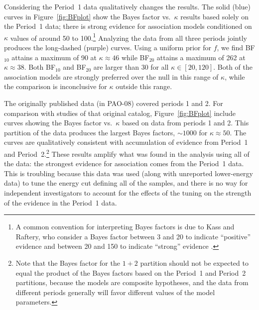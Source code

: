 Considering the Period~1 data qualitatively changes the results.  The
solid (blue) curves in Figure~\ref{fig:BFplot} show the Bayes factor
vs.\ $\kappa$ results based solely on the Period~1 data; there is
strong evidence for association models conditioned on $\kappa$ values
of around 50 to 100.\footnote{A common convention for interpreting
Bayes factors is due to Kass and Raftery, who consider a Bayes factor between
3 and 20 to indicate ``positive'' evidence and between 20 and 150 to indicate
``strong'' evidence \cite{Kass:Raft:baye:1995}.}
Analyzing the data from all three periods jointly produces the long-dashed
(purple) curves.  Using a uniform prior for $f$, we find BF$_{10}$ attains a
maximum of 90 at $\kappa\approx 46$ while BF$_{20}$ attains a maximum of 262
at $\kappa\approx 38$.  Both BF$_{10}$ and BF$_{20}$ are larger than 30 for
all $\kappa\in[20,120]$.  Both of the association models are strongly
preferred over the null in this range of $\kappa$, while the comparison is
inconclusive for $\kappa$ outside this range.

The originally published data (in PAO-08) covered periods 1 and 2.  For
comparison with studies of that original catalog, Figure~\ref{fig:BFplot}
include curves showing the Bayes factor vs.\ $\kappa$ based on data
from periods 1 and 2.  This partition of the data produces the largest
Bayes factors, $\sim 1000$ for $\kappa \approx 50$.  The curves are
qualitatively consistent with accumulation of evidence from Period~1 and
Period~2.\footnote{Note that the Bayes
factor for the $1+2$ partition should not be expected to equal the
product of the Bayes factors based on the Period~1 and Period~2 partitions,
because the models are composite hypotheses, and the data from different
periods generally will favor different values of the model parameters.}
These results amplify what was found in the analysis using all of
the data:  the strongest evidence for association comes from the Period~1
data.  This is troubling because this data was used (along with unreported
lower-energy data) to tune the energy cut defining all of the samples, and
there is no way for independent investigators to account for the effects of
the tuning on the strength of the evidence in the Period~1 data.

